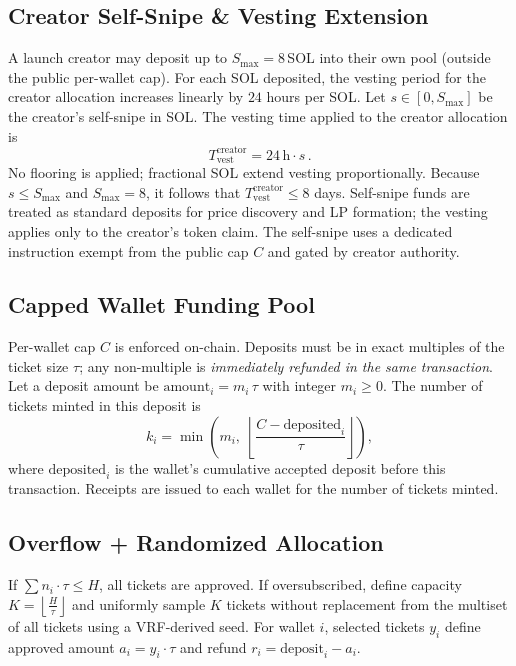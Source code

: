 \documentclass[10pt,twocolumn]{article}
\newcommand{\CreatorSnipeMax}{8}   %
\newcommand{\VestingPerSolHours}{24} %
\begin{document}
\subsection*{Creator Self-Snipe \& Vesting Extension}
A launch creator may deposit up to $S_{\max}{=}\CreatorSnipeMax$\,SOL into their own pool (outside the public per-wallet cap). For each SOL deposited, the vesting period for the creator allocation increases linearly by $\VestingPerSolHours$ hours per SOL. Let $s \in [0, S_{\max}]$ be the creator's self-snipe in SOL. The vesting time applied to the creator allocation is
\[
T_{\text{vest}}^{\text{creator}} = \VestingPerSolHours\,\text{h} \cdot s\,.
\]
No flooring is applied; fractional SOL extend vesting proportionally. Because $s \le S_{\max}$ and $S_{\max}{=}\CreatorSnipeMax$, it follows that $T_{\text{vest}}^{\text{creator}} \le \CreatorSnipeMax$ days. Self-snipe funds are treated as standard deposits for price discovery and LP formation; the vesting applies only to the creator's token claim. The self-snipe uses a dedicated instruction exempt from the public cap $C$ and gated by creator authority.

\subsection*{Capped Wallet Funding Pool}
Per-wallet cap $C$ is enforced on-chain. Deposits must be in exact multiples of the ticket size $\tau$; any non-multiple is \emph{immediately refunded in the same transaction}. Let a deposit amount be $\text{amount}_i = m_i\,\tau$ with integer $m_i \ge 0$. The number of tickets minted in this deposit is
\[
k_i = \min\!\left( m_i,\; \left\lfloor \frac{C - \text{deposited}_i}{\tau} \right\rfloor \right),
\]
where $\text{deposited}_i$ is the wallet's cumulative accepted deposit before this transaction. Receipts are issued to each wallet for the number of tickets minted.

\subsection*{Overflow + Randomized Allocation}
If $\sum n_i \cdot \tau \le H$, all tickets are approved. If oversubscribed, define capacity $K = \left\lfloor \frac{H}{\tau} \right\rfloor$ and uniformly sample $K$ tickets without replacement from the multiset of all tickets using a VRF-derived seed. For wallet $i$, selected tickets $y_i$ define approved amount $a_i = y_i \cdot \tau$ and refund $r_i = \text{deposit}_i - a_i$.
\end{document}
